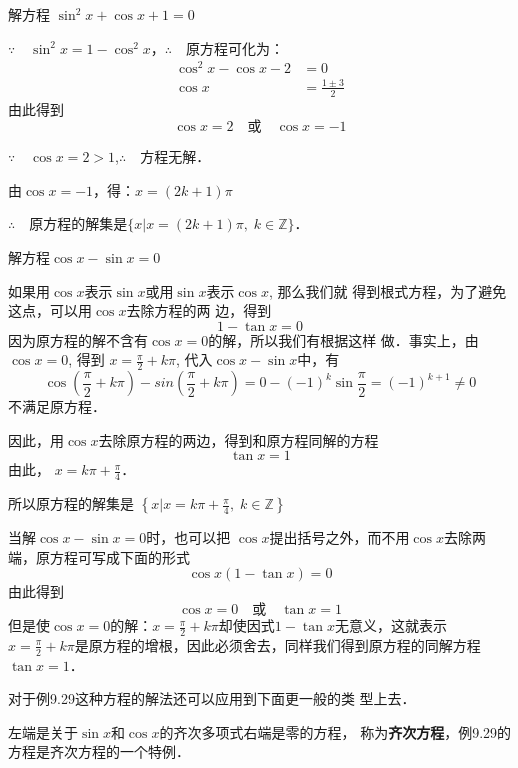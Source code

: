 \begin{example}
    解方程 $\sin^2 x+\cos x+1=0$
\end{example}

\begin{solution}
$\because\quad \sin^2 x=1-\cos^2x$，\qquad $\therefore\quad $原方程可化为：
\[\begin{split}
    \cos^2x-\cos x-2&=0\\
    \cos x&=\frac{1\pm 3}{2}
\end{split}\]
由此得到
\[\cos x=2\quad \text{或}\quad \cos x=-1\]

$\because\quad \cos x=2>1$,\qquad  $\therefore\quad $方程无解．

由$ \cos x=-1$，得：$x=(2k+1)\pi$

$\therefore\quad $原方程的解集是$\{x|x=(2k+1)\pi,\; k\in\mathbb{Z}\}$．
\end{solution}

\begin{example}
    解方程$\cos x-\sin x=0$
\end{example}

\begin{solution}
    如果用$\cos x$表示$\sin x$或用$\sin x$表示$\cos x$, 那么我们就
    得到根式方程，为了避免这点，可以用$\cos x$去除方程的两
    边，得到
    \[1-\tan x=0\]
    因为原方程的解不含有$\cos x=0$的解，所以我们有根据这样
    做．事实上，由$\cos x=0$, 得到
    $x=\frac{\pi}{2}+k\pi$, 代入$\cos x-\sin x$中，有
   \[ \cos\left(\frac{\pi}{2}+k\pi \right)-sin\left(\frac{\pi}{2}+k\pi \right)=0-(-1)^k\sin \frac{\pi}{2}=(-1)^{k+1}\ne 0\]
    不满足原方程．
    
    因此，用$\cos x$去除原方程的两边，得到和原方程同解的方程
    \[\tan x=1\]
    由此，
   $ x=k\pi +\frac{\pi}{4}$．

   所以原方程的解集是
$\left\{x\Big|x=k\pi+\frac{\pi}{4},\; k\in\mathbb{Z}\right\}$
\end{solution}

\begin{rmk}
当解$\cos x-\sin x=0$时，也可以把
$\cos x$提出括号之外，而不用$\cos x$去除两端，原方程可写成下面的形式
$$\cos x (1-\tan x)=0$$
由此得到
$$\cos x=0\quad \text{或}\quad \tan x=1$$
但是使$\cos x=0$的解：$x=\frac{\pi}{2}+k\pi$却使因式$1-\tan x$无意义，这就表示$x=\frac{\pi}{2}+k\pi$是原方程的增根，因此必须舍去，同样我们得到原方程的同解方程
$\tan x=1$．

对于例9.29这种方程的解法还可以应用到下面更一般的类
型上去．

左端是关于$\sin x$和$\cos x$的齐次多项式右端是零的方程，
称为\textbf{齐次方程}，例9.29的方程是齐次方程的一个特例．
\end{rmk}




